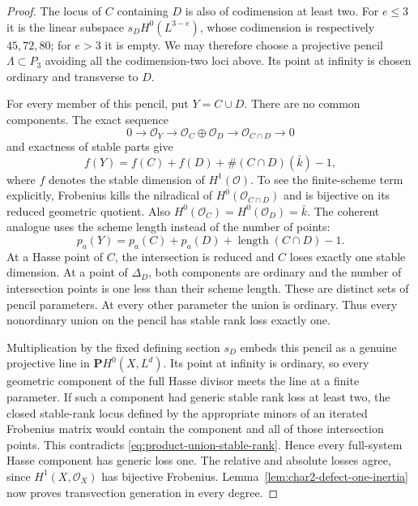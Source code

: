 \begin{proof}
The locus of $C$ containing $D$ is also of codimension at least
two.  For $e\le3$ it is the linear subspace
$s_D H^0(L^{3-e})$, whose codimension is respectively $45,72,80$;
for $e>3$ it is empty.  We may therefore choose a projective
pencil $\Lambda\subset P_3$ avoiding all the codimension-two
loci above.  Its point at infinity is chosen ordinary and
transverse to $D$.

For every member of this pencil, put $Y=C\cup D$.
There are no common components.  The exact sequence
\[
 0\longrightarrow\mathcal O_Y
 \longrightarrow\mathcal O_C\oplus\mathcal O_D
 \longrightarrow\mathcal O_{C\cap D}\longrightarrow0
\]
and exactness of stable parts give
\begin{equation}\label{eq:product-union-stable-rank}
 f(Y)=f(C)+f(D)+\#(C\cap D)(\bar k)-1,
\end{equation}
where $f$ denotes the stable dimension of $H^1(\mathcal O)$.
To see the finite-scheme term explicitly, Frobenius kills the
nilradical of $H^0(\mathcal O_{C\cap D})$ and is bijective on
its reduced geometric quotient.  Also $H^0(\mathcal O_C)=
H^0(\mathcal O_D)=\bar k$.  The coherent analogue uses the
scheme length instead of the number of points:
\[
 p_a(Y)=p_a(C)+p_a(D)+\operatorname{length}(C\cap D)-1.
\]
At a Hasse point of $C$, the intersection is reduced and $C$
loses exactly one stable dimension.  At a point of $\Delta_D$,
both components are ordinary and the number of intersection
points is one less than their scheme length.  These are distinct
sets of pencil parameters.  At every other parameter the union
is ordinary.  Thus every nonordinary union on the pencil has
stable rank loss exactly one.

Multiplication by the fixed defining section $s_D$ embeds this
pencil as a genuine projective line in $\mathbf P H^0(X,L^d)$.
Its point at infinity is ordinary, so every geometric component
of the full Hasse divisor meets the line at a finite parameter.
If such a component had generic stable rank loss at least two,
the closed stable-rank locus defined by the appropriate minors
of an iterated Frobenius matrix would contain the component and
all of those intersection points.  This contradicts
\eqref{eq:product-union-stable-rank}.  Hence every full-system
Hasse component has generic loss one.  The relative and absolute
losses agree, since $H^1(X,\mathcal O_X)$ has bijective Frobenius.
Lemma~\ref{lem:char2-defect-one-inertia} now proves transvection
generation in every degree.
\end{proof}


